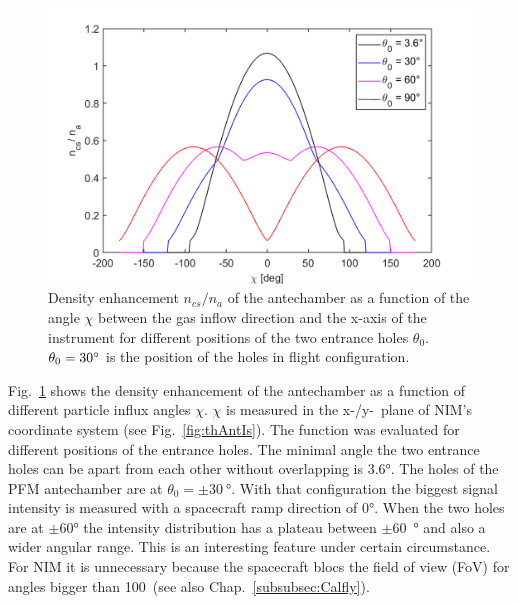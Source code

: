 	\begin{figure}[h!] %
		\centering
		\includegraphics[width= .8\textwidth]{Bilder/Chi_theta0.png}
		\caption{Density enhancement $n_{cs}/n_a$ of the antechamber as a function of the angle $\chi$ between the gas inflow direction and the x-axis of the instrument for different positions of the two entrance holes $\theta_0$. $\theta_0=30^\circ$ is the position of the holes in flight configuration.}
		\label{th:densEnhChiTheta}
	\end{figure}
	Fig.~\ref{th:densEnhChiTheta} shows the density enhancement of the antechamber as a function of different particle influx angles $\chi$. $\chi$ is measured in the x-/y-~plane of NIM's coordinate system (see Fig.~\ref{fig:thAntIs}). The function was evaluated for different positions of the entrance holes. The minimal angle the two entrance holes can be apart from each other without overlapping is 3.6\si{\degree}. The holes of the PFM antechamber are at $\theta_0 = \pm30~\si{\degree}$. With that configuration the biggest signal intensity is measured with a spacecraft ramp direction of 0\si{\degree}. When the two holes are at $\pm$60\si{\degree} the intensity distribution has a plateau between $\pm$60~\si{\degree} and also a wider angular range. This is an interesting feature under certain circumstance. For NIM it is unnecessary because the spacecraft blocs the field of view (FoV) for angles bigger than 100\degree~(see also Chap.~\ref{subsubsec:Calfly}).
	\newpage
	
